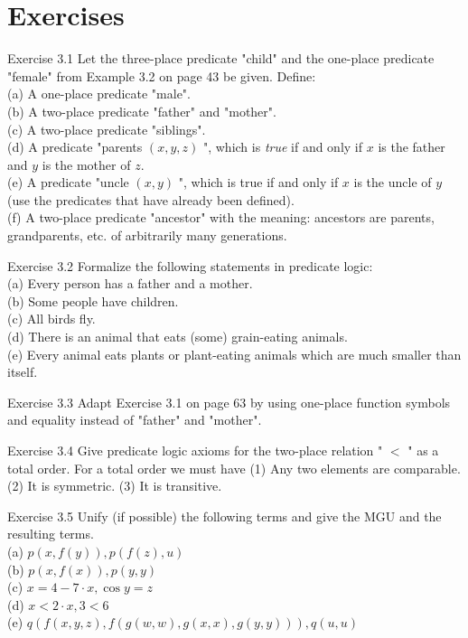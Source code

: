 \documentclass[10pt]{book}
\begin{document}
\section{Exercises}
Exercise 3.1 Let the three-place predicate "child" and the one-place predicate "female" from Example 3.2 on page 43 be given. Define:\\
(a) A one-place predicate "male".\\
(b) A two-place predicate "father" and "mother".\\
(c) A two-place predicate "siblings".\\
(d) A predicate "parents $(x, y, z)$ ", which is \textit{true} if and only if $x$ is the father and $y$ is the mother of $z$.\\
(e) A predicate "uncle $(x, y)$ ", which is true if and only if $x$ is the uncle of $y$ (use the predicates that have already been defined).\\
(f) A two-place predicate "ancestor" with the meaning: ancestors are parents, grandparents, etc. of arbitrarily many generations.


Exercise 3.2 Formalize the following statements in predicate logic:\\
(a) Every person has a father and a mother.\\
(b) Some people have children.\\
(c) All birds fly.\\
(d) There is an animal that eats (some) grain-eating animals.\\
(e) Every animal eats plants or plant-eating animals which are much smaller than itself.

Exercise 3.3 Adapt Exercise 3.1 on page 63 by using one-place function symbols and equality instead of "father" and "mother".

Exercise 3.4 Give predicate logic axioms for the two-place relation " $<$ " as a total order. For a total order we must have (1) Any two elements are comparable. (2) It is symmetric. (3) It is transitive.

Exercise 3.5 Unify (if possible) the following terms and give the MGU and the resulting terms.\\
(a) $p(x, f(y)), p(f(z), u)$\\
(b) $p(x, f(x)), p(y, y)$\\
(c) $x=4-7 \cdot x, \cos y=z$\\
(d) $x<2 \cdot x, 3<6$\\
(e) $q(f(x, y, z), f(g(w, w), g(x, x), g(y, y))), q(u, u)$
\end{document}
